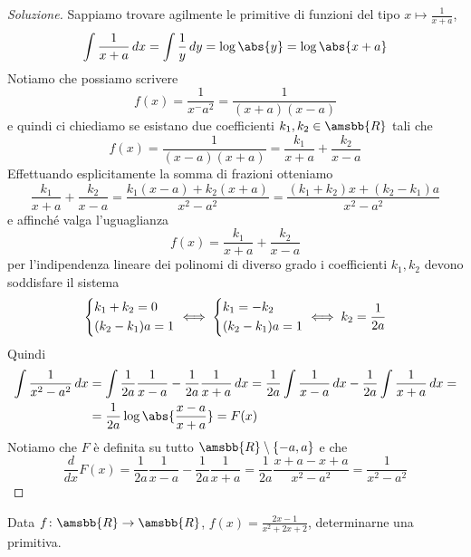 \begin{proof}[Soluzione]
    Sappiamo trovare agilmente le primitive di funzioni del tipo $x\mapsto \frac{1}{x+a}$, 
    \[
    \int \frac{1}{x+a}\, dx = \int \frac{1}{y}\, dy = \log\abs{y} = \log\abs{x+a}
    \]
    Notiamo che possiamo scrivere
    \[
    f(x) = \frac{1}{x^-a^2} = \frac{1}{(x+a)(x-a)}
    \]
    e quindi ci chiediamo se esistano due coefficienti $k_1, k_2\in\amsbb{R}$ tali che
    \[
    f(x) = \frac{1}{(x-a)(x+a)} = \frac{k_1}{x+a} + \frac{k_2}{x-a}
    \]
    Effettuando esplicitamente la somma di frazioni otteniamo
    \[
    \frac{k_1}{x+a} + \frac{k_2}{x-a} = \frac{k_1(x-a)+k_2(x+a)}{x^2-a^2} = \frac{(k_1+k_2)x+(k_2-k_1)a}{x^2-a^2}
    \]
    e affinché valga l'uguaglianza
    \[
    f(x) = \frac{k_1}{x+a}+\frac{k_2}{x-a}
    \]
    per l'indipendenza lineare dei polinomi di diverso grado i coefficienti $k_1, k_2$ devono soddisfare il sistema
    \[
    \begin{dcases}
        k_1 +k_2 = 0\\
        (k_2-k_1)a=1
    \end{dcases} \iff \begin{dcases}
        k_1 =- k_2\\
        (k_2-k_1)a=1
    \end{dcases} \iff k_2 = \frac{1}{2a}
    \]
    Quindi
    \[
    \begin{split}
        \int \frac{1}{x^2-a^2}\, dx & = \int \frac{1}{2a}\frac{1}{x-a}-\frac{1}{2a}\frac{1}{x+a}\, dx = \frac{1}{2a}\int \frac{1}{x-a}\, dx - \frac{1}{2a}\int \frac{1}{x+a}\, dx = \\
        & = \frac{1}{2a}\log\abs{\frac{x-a}{x+a}}=F(x)
    \end{split}
    \]
    Notiamo che $F$ è definita su tutto $\amsbb{R}\setminus\{-a,a\}$ e che 
    \[
    \frac{d}{dx}F(x) = \frac{1}{2a} \frac{1}{x-a}-\frac{1}{2a}\frac{1}{x+a} = \frac{1}{2a}\frac{x+a-x+a}{x^2-a^2} = \frac{1}{x^2-a^2}
    \]
\end{proof}
\begin{exercise}
    \label{ex:8.6}
    Data $f\colon \amsbb{R}\to\amsbb{R}$, $f(x)=\frac{2x-1}{x^2+2x+2}$, determinarne una primitiva.
\end{exercise}
